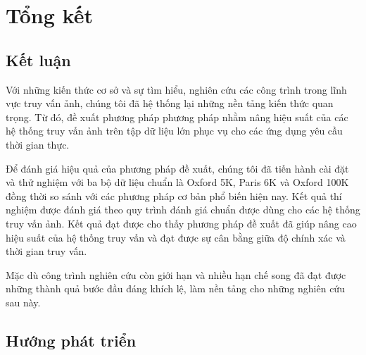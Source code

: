 \def\baselinestretch{1}
\chapter{Tổng kết}
\label{chapter:summarize}
\ifpdf
    \graphicspath{{Conclusions/ConclusionsFigs/PNG/}{Conclusions/ConclusionsFigs/PDF/}{Conclusions/ConclusionsFigs/}}
\else
    \graphicspath{{Conclusions/ConclusionsFigs/EPS/}{Conclusions/ConclusionsFigs/}}
\fi

\section{Kết luận}
Với những kiến thức cơ sở và sự tìm hiểu, nghiên cứu các công trình trong lĩnh vực truy vấn ảnh, chúng tôi đã hệ thống lại những nền tảng kiến thức quan trọng. Từ đó, đề xuất phương pháp phương pháp nhằm nâng hiệu suất của các hệ thống truy vấn ảnh trên tập dữ liệu lớn phục vụ cho các ứng dụng yêu cầu thời gian thực.

Để đánh giá hiệu quả của phương pháp đề xuất, chúng tôi đã tiến hành cài đặt và thử nghiệm với ba bộ dữ liệu chuẩn là Oxford 5K, Paris 6K và Oxford 100K đồng thời so sánh với các phương pháp cơ bản phổ biến hiện nay. Kết quả thí nghiệm được đánh giá theo quy trình đánh giá chuẩn được dùng cho các hệ thống truy vấn ảnh. Kết quả đạt được cho thấy phương pháp đề xuất đã giúp nâng cao hiệu suất của hệ thống truy vấn và đạt được sự cân bằng giữa độ chính xác và thời gian truy vấn.

Mặc dù công trình nghiên cứu còn giới hạn và nhiều hạn chế song đã đạt được những thành quả bước đầu đáng khích lệ, làm nền tảng cho những nghiên cứu sau này.

\section{Hướng phát triển}
